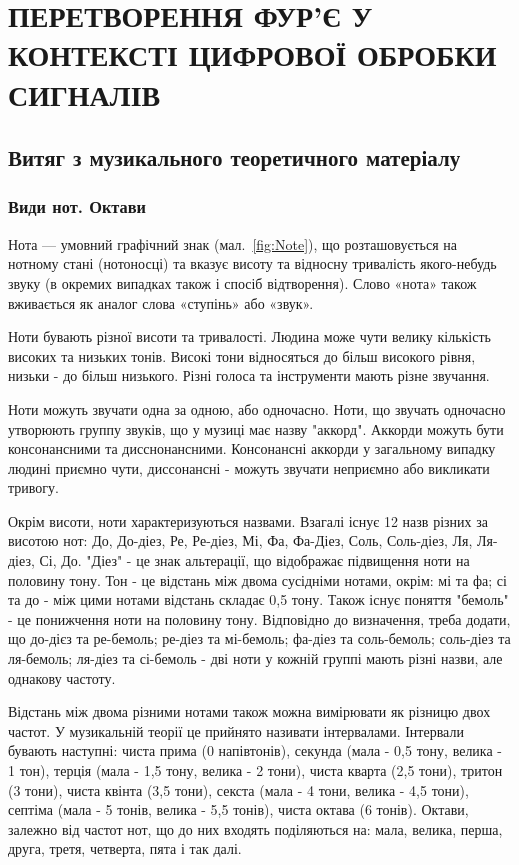 \section{ПЕРЕТВОРЕННЯ ФУР'Є У КОНТЕКСТІ ЦИФРОВОЇ ОБРОБКИ СИГНАЛІВ}

\subsection{Витяг з музикального теоретичного матеріалу}

\subsubsection{Види нот. Октави}


Нота — умовний графічний знак (мал.~\ref{fig:Note}), що розташовується на нотному стані (нотоносці) та вказує висоту та відносну тривалість якого-небудь звуку (в окремих випадках також і спосіб відтворення). Слово «нота» також вживається як аналог слова «ступінь» або «звук».

Ноти бувають різної висоти та тривалості. Людина може чути велику кількість високих та низьких тонів. Високі тони відносяться до більш високого рівня, низьки - до більш низького. Різні голоса та інструменти мають різне звучання. 

Ноти можуть звучати одна за одною, або одночасно. Ноти, що звучать одночасно утворюють группу звуків, що у музиці має назву "аккорд". Аккорди можуть бути консонансними та дисснонансними. Консонансні аккорди у загальному випадку людині приємно чути, диссонансні - можуть звучати неприємно або викликати тривогу. 

Окрім висоти, ноти характеризуються назвами. Взагалі існує 12 назв різних за висотою нот: До, До-діез, Ре, Ре-діез, Мі, Фа, Фа-Діез, Соль, Соль-діез, Ля, Ля-діез, Сі, До. "Діез" - це знак альтерації, що відображає підвищення ноти на половину тону. Тон - це відстань між двома сусідніми нотами, окрім: мі та фа; сі та до - між цими нотами відстань складає 0,5 тону. Також існує поняття "бемоль" - це понижчення ноти на половину тону. Відповідно до визначення, треба додати, що до-дієз та ре-бемоль; ре-діез та мі-бемоль; фа-діез та соль-бемоль; соль-діез та ля-бемоль; ля-діез та сі-бемоль - дві ноти у кожній группі мають різні назви, але однакову частоту.

\label{octaves-info}
Відстань між двома різними нотами також можна вимірювати як різницю двох частот. У музикальній теорії це прийнято називати інтервалами. Інтервали бувають наступні: чиста прима (0 напівтонів), секунда (мала - 0,5 тону, велика - 1 тон), терція (мала - 1,5 тону, велика - 2 тони), чиста кварта (2,5 тони), тритон (3 тони), чиста квінта (3,5 тони), секста (мала - 4 тони, велика - 4,5 тони), септіма (мала - 5 тонів, велика - 5,5 тонів), чиста октава (6 тонів).  Октави, залежно від частот нот, що до них входять поділяються на: мала, велика, перша, друга, третя, четверта, пята і так далі.

